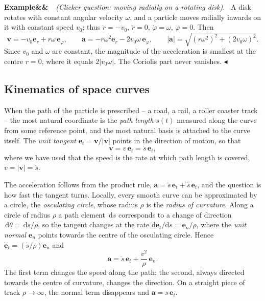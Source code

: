 \documentclass[11pt,a4paper,oneside]{report}
\numberwithin{equation}{chapter}
\newcommand{\vect}[1]{\bm{#1}}
\newcommand{\e}[1]{\vect{e}_{#1}}
\newcommand{\dd}{\,\mathrm{d}}
\theoremstyle{plain}
\theoremstyle{definition}
\theoremstyle{remark}
\newenvironment{example}[2]{%
  \par\addvspace{\bigskipamount}\noindent
  \textbf{Example\ifx&#1&\else~#1\fi}\ \textit{(#2).}\ \ignorespaces}%
  {\hfill$\blacktriangleleft$\par\addvspace{\bigskipamount}}
\begin{document}
\begin{example}{}{Clicker question: moving radially on a rotating disk}
A disk rotates with constant angular velocity $\omega$, and a particle moves radially inwards on it with constant
speed $v_0$; thus $\dot r=-v_0$, $\ddot r=0$, $\dot\varphi=\omega$, $\ddot\varphi=0$. Then
\[
  \vect v=-v_0\e r+r\omega\,\e\varphi,\qquad\vect a=-r\omega^2\e r-2v_0\omega\,\e\varphi,\qquad
  |\vect a|=\sqrt{(r\omega^2)^2+(2v_0\omega)^2}.
\]
Since $v_0$ and $\omega$ are constant, the magnitude of the acceleration is smallest at the centre $r=0$, where it
equals $2|v_0\omega|$. The Coriolis part never vanishes.
\end{example}

\subsection{Kinematics of space curves}
When the path of the particle is prescribed -- a road, a rail, a roller coaster track -- the most natural coordinate
is the \emph{path length} $s(t)$ measured along the curve from some reference point, and the most natural basis is
attached to the curve itself. The \emph{unit tangent} $\e t=\vect v/|\vect v|$ points in the direction of motion,
so that
\begin{equation}
  \vect v=v\,\e t=\dot s\,\e t ,
\end{equation}
where we have used that the speed is the rate at which path length is covered, $v=|\vect v|=\dot s$.

The acceleration follows from the product rule, $\vect a=\ddot s\,\e t+\dot s\,\dot{\vect e}_t$, and the question is
how fast the tangent turns. Locally, every smooth curve can be approximated by a circle, the \emph{osculating
circle}, whose radius $\rho$ is the \emph{radius of curvature}. Along a circle of radius $\rho$ a path element
$\dd s$ corresponds to a change of direction $\dd\theta=\dd s/\rho$, so the tangent changes at the rate
$\mathrm d\e t/\mathrm ds=\e n/\rho$, where the \emph{unit normal} $\e n$ points towards the centre of the
osculating circle. Hence $\dot{\vect e}_t=(\dot s/\rho)\e n$ and
\begin{equation}\label{eq:path-a}
  \vect a=\ddot s\,\e t+\frac{v^2}{\rho}\,\e n .
\end{equation}
The first term changes the speed along the path; the second, always directed towards the centre of curvature,
changes the direction. On a straight piece of track $\rho\to\infty$, the normal term disappears and
$\vect a=\ddot s\,\e t$.
\end{document}
